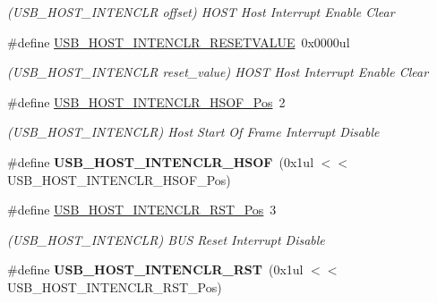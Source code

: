 \begin{DoxyCompactItemize}
\begin{DoxyCompactList}\small\item\em (U\+S\+B\+\_\+\+H\+O\+S\+T\+\_\+\+I\+N\+T\+E\+N\+C\+L\+R offset) H\+O\+S\+T Host Interrupt Enable Clear \end{DoxyCompactList}\item 
\hypertarget{group___s_a_m_l21___u_s_b_gaffd96de5361f8c95f4a8494ef8a3256d}{}\#define \hyperlink{group___s_a_m_l21___u_s_b_gaffd96de5361f8c95f4a8494ef8a3256d}{U\+S\+B\+\_\+\+H\+O\+S\+T\+\_\+\+I\+N\+T\+E\+N\+C\+L\+R\+\_\+\+R\+E\+S\+E\+T\+V\+A\+L\+U\+E}~0x0000ul\label{group___s_a_m_l21___u_s_b_gaffd96de5361f8c95f4a8494ef8a3256d}

\begin{DoxyCompactList}\small\item\em (U\+S\+B\+\_\+\+H\+O\+S\+T\+\_\+\+I\+N\+T\+E\+N\+C\+L\+R reset\+\_\+value) H\+O\+S\+T Host Interrupt Enable Clear \end{DoxyCompactList}\item 
\hypertarget{group___s_a_m_l21___u_s_b_ga480dccfc4b0d08e4eb3794b1f39492fc}{}\#define \hyperlink{group___s_a_m_l21___u_s_b_ga480dccfc4b0d08e4eb3794b1f39492fc}{U\+S\+B\+\_\+\+H\+O\+S\+T\+\_\+\+I\+N\+T\+E\+N\+C\+L\+R\+\_\+\+H\+S\+O\+F\+\_\+\+Pos}~2\label{group___s_a_m_l21___u_s_b_ga480dccfc4b0d08e4eb3794b1f39492fc}

\begin{DoxyCompactList}\small\item\em (U\+S\+B\+\_\+\+H\+O\+S\+T\+\_\+\+I\+N\+T\+E\+N\+C\+L\+R) Host Start Of Frame Interrupt Disable \end{DoxyCompactList}\item 
\hypertarget{group___s_a_m_l21___u_s_b_ga67e6252e514acff079a481de7a291c36}{}\#define {\bfseries U\+S\+B\+\_\+\+H\+O\+S\+T\+\_\+\+I\+N\+T\+E\+N\+C\+L\+R\+\_\+\+H\+S\+O\+F}~(0x1ul $<$$<$ U\+S\+B\+\_\+\+H\+O\+S\+T\+\_\+\+I\+N\+T\+E\+N\+C\+L\+R\+\_\+\+H\+S\+O\+F\+\_\+\+Pos)\label{group___s_a_m_l21___u_s_b_ga67e6252e514acff079a481de7a291c36}

\item 
\hypertarget{group___s_a_m_l21___u_s_b_gada16dba7d0bc11a0813ec2505b40bdb8}{}\#define \hyperlink{group___s_a_m_l21___u_s_b_gada16dba7d0bc11a0813ec2505b40bdb8}{U\+S\+B\+\_\+\+H\+O\+S\+T\+\_\+\+I\+N\+T\+E\+N\+C\+L\+R\+\_\+\+R\+S\+T\+\_\+\+Pos}~3\label{group___s_a_m_l21___u_s_b_gada16dba7d0bc11a0813ec2505b40bdb8}

\begin{DoxyCompactList}\small\item\em (U\+S\+B\+\_\+\+H\+O\+S\+T\+\_\+\+I\+N\+T\+E\+N\+C\+L\+R) B\+U\+S Reset Interrupt Disable \end{DoxyCompactList}\item 
\hypertarget{group___s_a_m_l21___u_s_b_ga111111eb157c1236b4ac9a5d3eb93ea0}{}\#define {\bfseries U\+S\+B\+\_\+\+H\+O\+S\+T\+\_\+\+I\+N\+T\+E\+N\+C\+L\+R\+\_\+\+R\+S\+T}~(0x1ul $<$$<$ U\+S\+B\+\_\+\+H\+O\+S\+T\+\_\+\+I\+N\+T\+E\+N\+C\+L\+R\+\_\+\+R\+S\+T\+\_\+\+Pos)\label{group___s_a_m_l21___u_s_b_ga111111eb157c1236b4ac9a5d3eb93ea0}


\end{DoxyCompactItemize}
